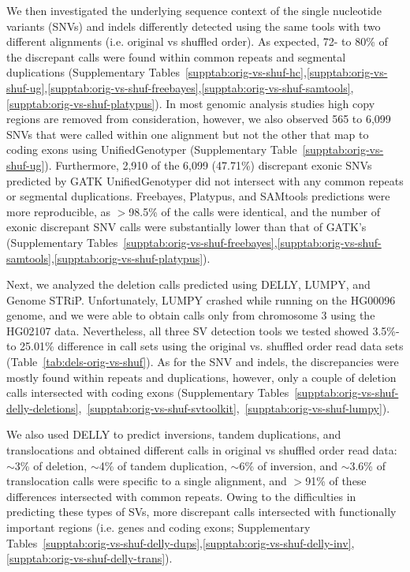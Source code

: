 \documentclass[10pt,a4paper]{article}
\begin{document}
We then investigated the underlying sequence context of the single nucleotide variants (SNVs) 
and indels differently detected using the same tools with two different alignments (i.e. original vs shuffled order). 
As expected, 72- to 80\% of the discrepant calls were found within common repeats and segmental duplications (Supplementary Tables~\ref{supptab:orig-vs-shuf-hc},\ref{supptab:orig-vs-shuf-ug},\ref{supptab:orig-vs-shuf-freebayes},\ref{supptab:orig-vs-shuf-samtools},\ref{supptab:orig-vs-shuf-platypus}). 
In most genomic analysis studies high copy regions are removed from consideration, however, we also observed 565 to 6,099 
SNVs that were called within one alignment but not the other that map to coding exons using UnifiedGenotyper (Supplementary Table~\ref{supptab:orig-vs-shuf-ug}). 
Furthermore, 2,910 of the 6,099 (47.71\%) discrepant exonic SNVs predicted by GATK UnifiedGenotyper did not intersect with any common repeats or segmental duplications.
Freebayes, Platypus, and SAMtools predictions were more reproducible, as $>$98.5\% of the calls were identical, and the number of exonic discrepant SNV calls were substantially lower than
that of GATK's (Supplementary Tables~\ref{supptab:orig-vs-shuf-freebayes},\ref{supptab:orig-vs-shuf-samtools},\ref{supptab:orig-vs-shuf-platypus}). 

Next, we analyzed the deletion calls predicted using DELLY, LUMPY, and Genome STRiP. Unfortunately, LUMPY crashed while running on the HG00096 genome, and we were able to obtain calls only from chromosome 3 using the HG02107 data. Nevertheless, all three SV detection tools we tested showed 3.5\%- to 25.01\% difference in call sets using the original vs. shuffled order read data sets (Table~\ref{tab:dels-orig-vs-shuf}). As for the SNV and indels, the discrepancies were mostly found within repeats and duplications, however, only a couple of deletion calls intersected with coding exons (Supplementary Tables~\ref{supptab:orig-vs-shuf-delly-deletions},~\ref{supptab:orig-vs-shuf-svtoolkit},~\ref{supptab:orig-vs-shuf-lumpy}). 

We also used DELLY to predict inversions, tandem duplications, and translocations and obtained different calls in original vs shuffled order read data: $\sim$3\% of deletion, $\sim$4\% of tandem duplication, $\sim$6\% of inversion, and $\sim$3.6\% of translocation calls were specific to a single alignment, and $>$91\% of these differences intersected with common repeats. Owing to the difficulties in predicting
these types of SVs, more discrepant calls intersected with functionally important regions (i.e. genes and coding exons; Supplementary Tables~\ref{supptab:orig-vs-shuf-delly-dups},\ref{supptab:orig-vs-shuf-delly-inv},\ref{supptab:orig-vs-shuf-delly-trans}).
\end{document}
